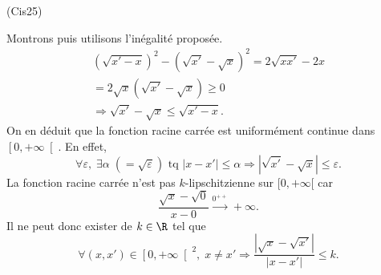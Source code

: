 \begin{tiny}(Cis25)\end{tiny} Montrons puis utilisons l'inégalité proposée.
\begin{multline*}
 (\sqrt{x'-x})^2 - (\sqrt{x'} - \sqrt{x})^2
 = 2\sqrt{xx'} - 2x \\
 = 2\sqrt{x} (\sqrt{x'} - \sqrt{x}) \geq 0 \\
 \Rightarrow 
 \sqrt{x'} - \sqrt{x} \leq \sqrt{x' - x}.
\end{multline*}
On en déduit que la fonction racine carrée est uniformément continue dans $\left[ 0, + \infty\right[$. En effet,
\begin{displaymath}
 \forall \varepsilon, \; \exists \alpha\; ( =\sqrt{\varepsilon} )\text{ tq } 
 |x - x' | \leq \alpha \Rightarrow \left|\sqrt{x'} - \sqrt{x}\right| \leq \varepsilon.
\end{displaymath}
La fonction racine carrée n'est pas $k$-lipschitzienne sur $[0,+\infty[$ car
\[
 \frac{\sqrt{x} - \sqrt{0}}{x - 0} \xrightarrow{0^{++}} +\infty.
\]
Il ne peut donc exister de $k\in \R$ tel que
\[
 \forall (x,x') \in \left[ 0,+\infty\right[^2, \;
 x \neq x' \Rightarrow \frac{\left|\sqrt{x} - \sqrt{x'}\right|}{\left|x - x'\right|} \leq k.
\]
